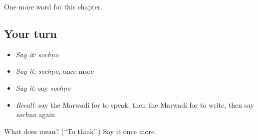 \begin{grammarlens}[title={What you've built}]
One more word for this chapter.
\end{grammarlens}

\subsection*{Your turn}
\begin{itemize}
\raggedright
  \item \emph{Say it:} \emph{sochṇo}
  \item \emph{Say it:} \emph{sochṇo}, once more
  \item \emph{Say it:} say \emph{sochṇo}
  \item \emph{Recall:} say the Marwadi for to speak, then the Marwadi for to write, then say \emph{sochṇo} again
\end{itemize}

\begin{tcolorbox}[breakable,colback=teal!4,colframe=teal!35!black,title={Before you move on}]
What does  mean? (\textquotedblleft{}To think\textquotedblright{}.) Say it once more.
\end{tcolorbox}
